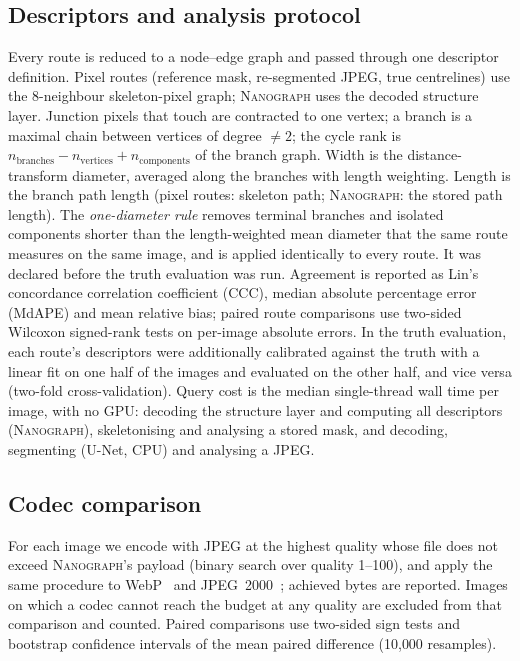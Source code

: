 \documentclass[10pt,a4paper]{article}
\newcommand{\method}{\textnormal{\textsc{Nanograph}}\xspace}
\begin{document}
\subsection{Descriptors and analysis protocol}\label{sec:downstream-methods}
Every route is reduced to a node--edge graph and passed through one
descriptor definition. Pixel routes (reference mask, re-segmented JPEG,
true centrelines) use the 8-neighbour skeleton-pixel graph; \method uses the
decoded structure layer. Junction pixels that touch are contracted to one
vertex; a branch is a maximal chain between vertices of degree $\neq2$; the
cycle rank is $n_\text{branches}-n_\text{vertices}+n_\text{components}$ of
the branch graph. Width is the distance-transform diameter, averaged along
the branches with length weighting. Length is the branch path length (pixel routes: skeleton
path; \method: the stored path length). The \emph{one-diameter rule}
removes terminal branches and isolated components shorter than the
length-weighted mean diameter that the same route measures on the same
image, and is applied identically to every route.
It was declared before the truth evaluation was run. Agreement is reported
as Lin's concordance correlation coefficient (CCC), median absolute
percentage error (MdAPE) and mean relative bias; paired route comparisons
use two-sided Wilcoxon signed-rank tests on per-image absolute errors. In
the truth evaluation, each route's descriptors were additionally calibrated
against the truth with a linear fit on one half of the images and evaluated
on the other half, and vice versa (two-fold cross-validation). Query cost is
the median single-thread wall time per image, with no GPU: decoding the
structure layer and computing all descriptors (\method), skeletonising and
analysing a stored mask, and decoding, segmenting (U-Net, CPU) and analysing
a JPEG.

\subsection{Codec comparison}
For each image we encode with JPEG at the highest quality whose file does
not exceed \method's payload (binary search over quality 1--100), and apply
the same procedure to WebP~\cite{webp} and JPEG~2000~\cite{skodras2001jpeg2000};
achieved bytes are reported. Images on which a codec cannot reach the
budget at any quality are excluded from that comparison and counted.
Paired comparisons use two-sided sign tests and bootstrap confidence
intervals of the mean paired difference (10{,}000 resamples).
\end{document}
